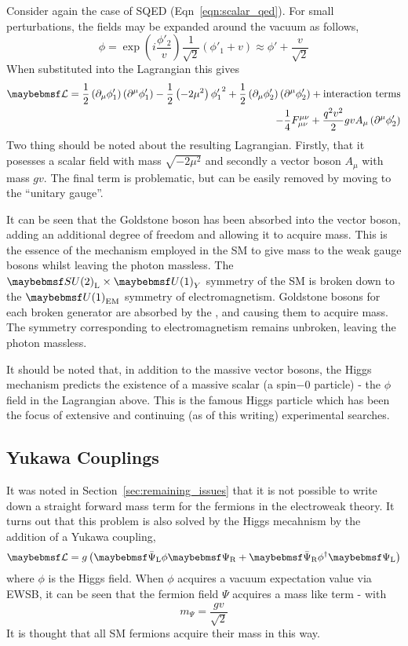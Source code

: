 Consider again the case of \ac{SQED} (Eqn~\ref{eqn:scalar_qed}). For small
perturbations, the fields may be expanded around the vacuum as follows,
\begin{equation}
\phi = \exp\left(i\frac{\phi'_2}{v}\right)\frac{1}{\sqrt{2}}\left(\phi'_1 + v\right) \approx
\phi' + \frac{v}{\sqrt{2}}
\end{equation}
When substituted into the Lagrangian this gives
\begin{align}
  \lagrangiand =
  \frac{1}{2}\left(\partial_{\mu}\phi'_1\right)\left(\partial^{\mu}\phi'_1\right)
  - \frac{1}{2}\left(-2\mu^2\right){\phi'_1}^2 +
  \frac{1}{2}\left(\partial_{\mu}\phi'_2\right)\left(\partial^{\mu}\phi'_2\right)
  + \textrm{interaction terms}\\
  - \frac{1}{4}F_{\mu\nu}^{\mu\nu} +
  \frac{q^2v^2}{2}gvA_{\mu}\left(\partial^{\mu}\phi'_2\right)
\end{align}
Two thing should be noted about the resulting Lagrangian. Firstly, that it
posesses a scalar field with mass $\sqrt{-2\mu^2}$ and secondly a vector
boson $A_{\mu}$ with mass $gv$. The final term is problematic, but can be
easily removed by moving to the ``unitary gauge''.

It can be seen that the Goldstone boson has been absorbed into the vector boson,
adding an additional degree of freedom and allowing it to acquire mass. This is
the essence of the mechanism employed in the \ac{SM} to give mass to the weak
gauge bosons whilst leaving the photon massless. The
$\SUtwo_{\textrm{L}}\times\Uone_{Y}$ symmetry of the \ac{SM} is broken down to
the $\Uone_{\textrm{EM}}$ symmetry of electromagnetism. Goldstone bosons for
each broken generator are absorbed by the \PWp, \PWm and \PZ causing them to
acquire mass. The symmetry corresponding to electromagnetism remains unbroken,
leaving the photon massless.

It should be noted that, in addition to the massive vector bosons, the Higgs
mechanism predicts the existence of a massive scalar (a spin$-0$ particle) - the
$\phi$ field in the Lagrangian above. This is the famous Higgs particle which
has been the focus of extensive and continuing (as of this writing) experimental
searches.

\subsection{Yukawa Couplings}
\label{sec:theory_yukawa}
It was noted in Section~\ref{sec:remaining_issues} that it is not possible to
write down a straight forward mass term for the fermions in the electroweak
theory. It turns out that this problem is also solved by the Higgs mecahnism by
the addition of a Yukawa coupling,
\begin{equation}
\lagrangiand = g \left(\APsiL \phi \PsiR + \APsiR\phi^{\dagger}\PsiL\right)
\end{equation}
where $\phi$ is the Higgs field. When $\phi$ acquires a vacuum expectation value
via \ac{EWSB}, it can be seen that the fermion field $\Psi$ acquires a mass like
term - with
\begin{equation}
m_{\Psi} = \frac{gv}{\sqrt{2}}
\end{equation}
It is thought that all \ac{SM} fermions acquire their mass in this way.

